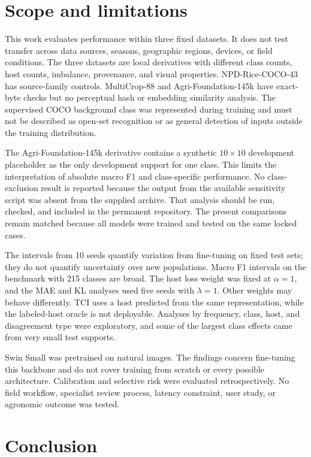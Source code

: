 \documentclass[preprint,12pt]{elsarticle}
\begin{document}
\section{Scope and limitations}
\label{sec:limitations}

This work evaluates performance within three fixed datasets. It does not test
transfer across data sources, seasons, geographic regions, devices, or field
conditions. The three datasets are local derivatives with different class
counts, host counts, imbalance, provenance, and visual properties.
NPD-Rice-COCO-43 has source-family controls. MultiCrop-88 and
Agri-Foundation-145k have exact-byte checks but no perceptual hash or embedding
similarity analysis. The supervised COCO background class was represented
during training and must not be described as open-set recognition or as general
detection of inputs outside the training distribution.

The Agri-Foundation-145k derivative contains a synthetic $10\times10$
development placeholder as the only development support for one class. This
limits the interpretation of absolute macro F1 and class-specific performance.
No class-exclusion result is reported because the output from the available
sensitivity script was absent from the supplied archive. That analysis should
be run, checked, and included in the permanent repository. The present
comparisons remain matched because all models were trained and tested on the
same locked cases.

The intervals from 10 seeds quantify variation from fine-tuning on fixed test
sets; they do not quantify uncertainty over new populations. Macro F1 intervals
on the benchmark with 215 classes are broad. The host loss weight was fixed at
$\alpha=1$, and the MAE and KL analyses used five seeds with $\lambda=1$.
Other weights may behave differently. TCI uses a host predicted from the same
representation, while the labeled-host oracle is not deployable. Analyses by
frequency, class, host, and disagreement type were exploratory, and some of the
largest class effects came from very small test supports.

Swin Small was pretrained on natural images. The findings concern fine-tuning
this backbone and do not cover training from scratch or every possible
architecture. Calibration and selective risk were evaluated retrospectively.
No field workflow, specialist review process, latency constraint, user study,
or agronomic outcome was tested.

\section{Conclusion}
\label{sec:conclusion}
\end{document}
